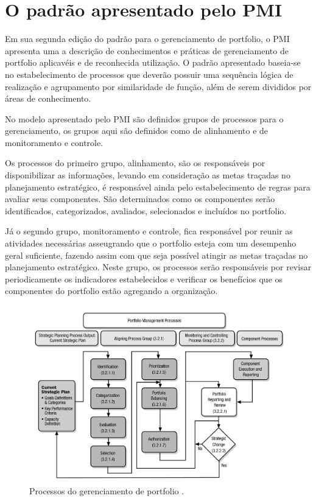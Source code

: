 \documentclass[12pt,a4paper,ruledheader,tocpage=prefix,floatnumber=continuous,pagestart=folhaderosto,font=times]{abnt}
\begin{document}
\section{O padrão apresentado pelo PMI}
Em sua segunda edição do padrão para o gerenciamento de portfolio, o PMI apresenta uma a descrição de conhecimentos e práticas de gerenciamento de 
portfolio aplicavéis e de reconhecida utilização. O padrão apresentado baseia-se no estabelecimento de processos que deverão possuir uma sequência lógica 
de realização e agrupamento por similaridade de função, além de serem divididos por áreas de conhecimento. \cite{sppm}

No modelo apresentado pelo PMI são definidos grupos de processos para o gerenciamento, os grupos aqui são definidos como de alinhamento e de monitoramento
e controle. 

Os processos do primeiro grupo, alinhamento, são os responsáveis por disponibilizar as informações, levando em consideração as metas traçadas 
no planejamento estratégico, é responsável ainda pelo estabelecimento de regras para avaliar seus componentes. São determinados como os componentes serão 
identificados, categorizados, avaliados, selecionados e incluídos no portfolio.

Já o segundo grupo, monitoramento e controle, fica responsável por reunir as atividades necessárias asseugrando que o portfolio esteja com um desempenho 
geral suficiente, fazendo assim com que seja possível atingir as metas traçadas no planejamento estratégico. Neste grupo, os processos serão responsáveis
por revisar periodicamente os indicadores estabelecidos e verificar os benefícios que os componentes do portfolio estão agregando a organização.

\begin{figure}[H]
\centering
\includegraphics[width=.9\textwidth]{modelo_pmi.jpg}
\caption{Processos do gerenciamento de portfolio \cite{sppm}.}
\end{figure}
\end{document}
